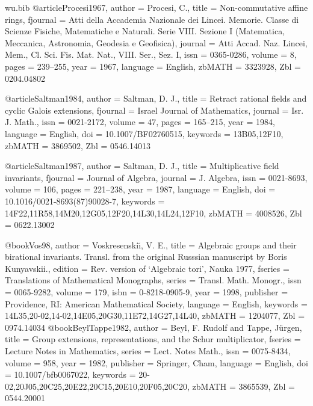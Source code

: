 \documentclass[12pt,a4paper]{article}
\theoremstyle{definition}
\begin{document}
\begin{filecontents}{wu.bib}
@article{Procesi1967,
	author = {Procesi, C.},
	title = {Non-commutative affine rings},
fjournal = {Atti della Accademia Nazionale dei Lincei. Memorie. Classe di
Scienze Fisiche, Matematiche e Naturali. Serie VIII. Sezione I (Matematica,
Meccanica, Astronomia, Geodesia e Geofisica)}, journal = {Atti Accad. Naz.
Lincei, Mem., Cl. Sci. Fis. Mat. Nat., VIII. Ser., Sez. I}, issn = {0365-0286},
volume = {8}, pages = {239--255}, year = {1967}, language = {English}, zbMATH =
{3323928}, Zbl = {0204.04802} }

@article{Saltman1984,
	author = {Saltman, D. J.},
	title = {Retract rational fields and cyclic {Galois} extensions},
	fjournal = {Israel Journal of Mathematics},
	journal = {Isr. J. Math.},
	issn = {0021-2172},
	volume = {47},
	pages = {165--215},
	year = {1984},
	language = {English},
	doi = {10.1007/BF02760515},
	keywords = {13B05,12F10},
	zbMATH = {3869502},
	Zbl = {0546.14013}
}	

@article{Saltman1987,
	author = {Saltman, D. J.},
	title = {Multiplicative field invariants},
	fjournal = {Journal of Algebra},
	journal = {J. Algebra},
	issn = {0021-8693},
	volume = {106},
	pages = {221--238},
	year = {1987},
	language = {English},
	doi = {10.1016/0021-8693(87)90028-7},
	keywords = {14F22,11R58,14M20,12G05,12F20,14L30,14L24,12F10},
	zbMATH = {4008526},
	Zbl = {0622.13002}
}	

	
@book{Vos98,
	author = {Voskresenski{\u{\i}}, V. E.},
title = {Algebraic groups and their birational invariants. {Transl}. from the
original {Russsian} manuscript by {Boris} {Kunyavskii}.}, edition = {Rev.
version of `{Algebraic} tori', {Nauka} 1977}, fseries = {Translations of
Mathematical Monographs}, series = {Transl. Math. Monogr.}, issn = {0065-9282},
volume = {179}, isbn = {0-8218-0905-9}, year = {1998}, publisher = {Providence,
RI: American Mathematical Society}, language = {English}, keywords =
{14L35,20-02,14-02,14E05,20G30,11E72,14G27,14L40}, zbMATH = {1204077}, Zbl =
{0974.14034} } @book{BeylTappe1982, author = {Beyl, F. Rudolf and Tappe,
J{\"u}rgen}, title = {Group extensions, representations, and the {Schur}
multiplicator}, fseries = {Lecture Notes in Mathematics}, series = {Lect. Notes
Math.}, issn = {0075-8434}, volume = {958}, year = {1982}, publisher =
{Springer, Cham}, language = {English}, doi = {10.1007/bfb0067022}, keywords =
{20-02,20J05,20C25,20E22,20C15,20E10,20F05,20C20}, zbMATH = {3865539}, Zbl =
{0544.20001} }
\end{filecontents}



\end{document}
